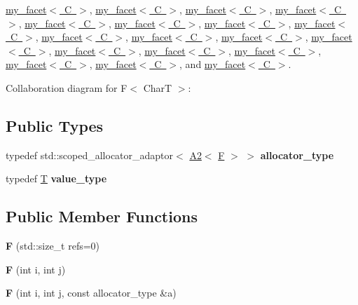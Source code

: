 \mbox{\hyperlink{structmy__facet}{my\+\_\+facet$<$ C $>$}}, \mbox{\hyperlink{structmy__facet}{my\+\_\+facet$<$ C $>$}}, \mbox{\hyperlink{structmy__facet}{my\+\_\+facet$<$ C $>$}}, \mbox{\hyperlink{structmy__facet}{my\+\_\+facet$<$ C $>$}}, \mbox{\hyperlink{structmy__facet}{my\+\_\+facet$<$ C $>$}}, \mbox{\hyperlink{structmy__facet}{my\+\_\+facet$<$ C $>$}}, \mbox{\hyperlink{structmy__facet}{my\+\_\+facet$<$ C $>$}}, \mbox{\hyperlink{structmy__facet}{my\+\_\+facet$<$ C $>$}}, \mbox{\hyperlink{structmy__facet}{my\+\_\+facet$<$ C $>$}}, \mbox{\hyperlink{structmy__facet}{my\+\_\+facet$<$ C $>$}}, \mbox{\hyperlink{structmy__facet}{my\+\_\+facet$<$ C $>$}}, \mbox{\hyperlink{structmy__facet}{my\+\_\+facet$<$ C $>$}}, \mbox{\hyperlink{structmy__facet}{my\+\_\+facet$<$ C $>$}}, \mbox{\hyperlink{structmy__facet}{my\+\_\+facet$<$ C $>$}}, \mbox{\hyperlink{structmy__facet}{my\+\_\+facet$<$ C $>$}}, \mbox{\hyperlink{structmy__facet}{my\+\_\+facet$<$ C $>$}}, \mbox{\hyperlink{structmy__facet}{my\+\_\+facet$<$ C $>$}}, and \mbox{\hyperlink{structmy__facet}{my\+\_\+facet$<$ C $>$}}.



Collaboration diagram for F$<$ CharT $>$\+:
\subsection*{Public Types}
\begin{DoxyCompactItemize}
\item 
\mbox{\label{struct_f_a916de55bcdb57b5e5853cb6707544522}} 
typedef std\+::scoped\+\_\+allocator\+\_\+adaptor$<$ \mbox{\hyperlink{struct_a2}{A2}}$<$ \mbox{\hyperlink{struct_f}{F}} $>$ $>$ {\bfseries allocator\+\_\+type}
\item 
\mbox{\label{struct_f_a6ccb70970dc378d72f3ccf8130a5d23f}} 
typedef \mbox{\hyperlink{struct_t}{T}} {\bfseries value\+\_\+type}
\end{DoxyCompactItemize}
\subsection*{Public Member Functions}
\begin{DoxyCompactItemize}
\item 
\mbox{\label{struct_f_a1a600071c6964bf2fa82682bd210d8fe}} 
{\bfseries F} (std\+::size\+\_\+t refs=0)
\item 
\mbox{\label{struct_f_a84d7863a20807da34c7677b4c695536b}} 
{\bfseries F} (int i, int j)
\item 
\mbox{\label{struct_f_ae92736037d892d803dc0308cd0f41330}} 
{\bfseries F} (int i, int j, const allocator\+\_\+type \&a)
\end{DoxyCompactItemize}
